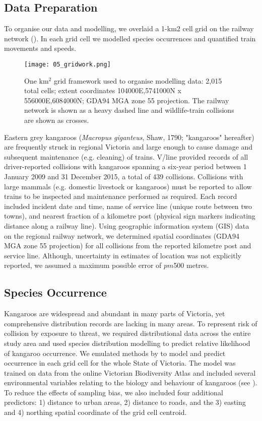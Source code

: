 \subsection{Data Preparation}

To organise our data and modelling, we overlaid a 1-km2 cell grid on the railway network ().  In each grid cell we modelled species occurrences and quantified train movements and speeds.

\begin{figure*}[htp]
  \centering
  \texttt{[image: 05\_gridwork.png]}
  \caption[Grid framework used to organise modelling data]{One km$^2$ grid framework used to organise modelling data: 2,015 total cells; extent coordinates 104000E,5741000N x 556000E,6084000N; GDA94 MGA zone 55 projection. The railway network is shown as a heavy dashed line and wildlife-train collisions are shown as crosses.}
  \label{trains_grid}
\end{figure*}

Eastern grey kangaroos (\textit{Macropus giganteus}, Shaw, 1790; "kangaroos" hereafter) are frequently struck in regional Victoria and large enough to cause damage and subsequent maintenance (e.g. cleaning) of trains.  V/line provided records of all driver-reported collisions with kangaroos spanning a six-year period between 1 January 2009 and 31 December 2015, a total of 439 collisions. Collisions with large mammals (e.g. domestic livestock or kangaroos) must be reported to allow trains to be inspected and maintenance performed as required. Each record included incident date and time, name of service line (unique route between two towns), and nearest fraction of a kilometre post (physical sign markers indicating distance along a railway line).  Using geographic information system (GIS) data on the regional railway network, we determined spatial coordinates (GDA94 MGA zone 55 projection) for all collisions from the reported kilometre post and service line. Although, uncertainty in estimates of location was not explicitly reported, we assumed a maximum possible error of $pm$500 metres.

\subsection{Species Occurrence}

Kangaroos are widespread \citep{daws12} and abundant in many parts of Victoria, yet comprehensive distribution records are lacking in many areas. To represent risk of collision by exposure to threat, we required distributional data across the entire study area and used species distribution modelling to predict relative likelihood of kangaroo occurrence.  We emulated methods by \cite{elit08} to model and predict occurrence in each grid cell for the whole State of Victoria. The model was trained on data from the online Victorian Biodiversity Atlas \citep{depi16} and included several environmental variables relating to the biology and behaviour of kangaroos (see ).  To reduce the effects of sampling bias, we also included four additional predictors:  1) distance to urban areas, 2) distance to roads, and the 3) easting and 4) northing spatial coordinate of the grid cell centroid.

